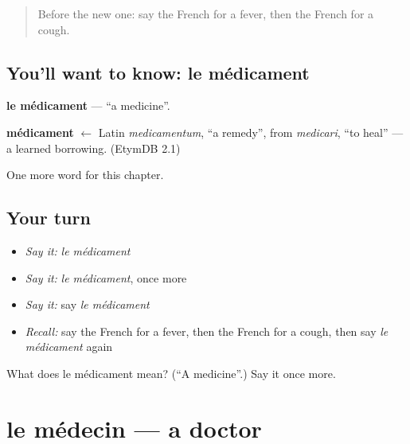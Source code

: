\label{lesson:FR-C53-medicament}



\begin{quote}
Before the new one: say the French for a fever, then the French for a cough.
\end{quote}

\subsection*{You'll want to know: le médicament}
\textbf{le médicament} — \textquotedblleft{}a medicine\textquotedblright{}.

\begin{cousinweb}
\textbf{médicament} $\leftarrow$ Latin \emph{medicamentum}, \textquotedblleft{}a remedy\textquotedblright{}, from \emph{medicari}, \textquotedblleft{}to heal\textquotedblright{} — a learned borrowing. (EtymDB 2.1)
\end{cousinweb}

\begin{grammarlens}[title={What you've built}]
One more word for this chapter.
\end{grammarlens}

\subsection*{Your turn}
\begin{itemize}
\raggedright
  \item \emph{Say it:} \emph{le médicament}
  \item \emph{Say it:} \emph{le médicament}, once more
  \item \emph{Say it:} say \emph{le médicament}
  \item \emph{Recall:} say the French for a fever, then the French for a cough, then say \emph{le médicament} again
\end{itemize}

\begin{tcolorbox}[breakable,colback=teal!4,colframe=teal!35!black,title={Before you move on}]
What does le médicament mean? (\textquotedblleft{}A medicine\textquotedblright{}.) Say it once more.
\end{tcolorbox}
\section[le médecin]{le médecin — a doctor}

\label{lesson:FR-C53-medecin}



